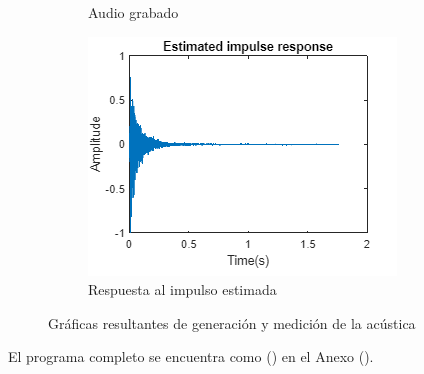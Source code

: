 \begin{figure}[!htb]
\begin{subfigure}{0.3\textwidth}
        \caption{\footnotesize Audio grabado}
        \label{fig:sub2}
    \end{subfigure}
    \hfill
    \begin{subfigure}{0.3\textwidth}
        \centering
        \includegraphics[width=\linewidth]{imagenes/EstimatedImpulseResponse_RIR_Measurement.png}
        \caption{\footnotesize Respuesta al impulso estimada}
        \label{fig:sub2}
    \end{subfigure}
    \caption{Gráficas resultantes de generación y medición de la acústica}
\end{figure}
\FloatBarrier

El programa completo se encuentra como () en el Anexo ().
